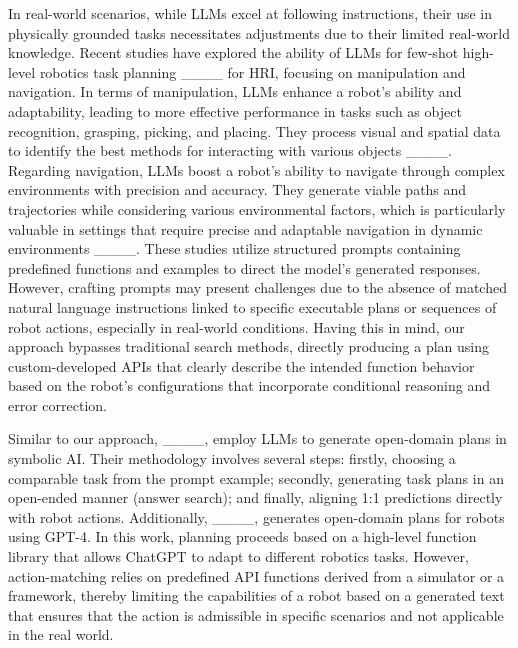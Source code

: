 In real-world scenarios, while LLMs excel at following instructions, their use in physically grounded tasks necessitates adjustments due to their limited real-world knowledge. 
Recent studies have explored the ability of LLMs for few-shot high-level robotics task planning ____ for HRI, focusing on manipulation and navigation. In terms of manipulation, LLMs enhance a robot's ability and adaptability, leading to more effective performance in tasks such as object recognition, grasping, picking, and placing. They process visual and spatial data to identify the best methods for interacting with various objects ____. Regarding navigation, LLMs boost a robot’s ability to navigate through complex environments with precision and accuracy. They generate viable paths and trajectories while considering various environmental factors, which is particularly valuable in settings that require precise and adaptable navigation in dynamic environments ____. These studies utilize structured prompts containing predefined functions and examples to direct the model's generated responses. However, crafting prompts may present challenges due to the absence of matched natural language instructions linked to specific executable plans or sequences of robot actions, especially in real-world conditions. Having this in mind, our approach bypasses traditional search methods, directly producing a plan using custom-developed APIs that clearly describe the intended function behavior based on the robot's configurations that incorporate conditional reasoning and error correction.


\color{black}
Similar to our approach, ____, employ LLMs to generate open-domain plans in symbolic AI. Their methodology involves several steps: firstly, choosing a comparable task from the prompt example; secondly, generating task plans in an open-ended manner (answer search); and finally, aligning 1:1 predictions directly with robot actions. Additionally, ____, generates open-domain plans for robots using GPT-4. In this work, planning proceeds based on a high-level function library that allows ChatGPT to adapt to different robotics tasks. However, action-matching relies on predefined API functions derived from a simulator or a framework, thereby limiting the capabilities of a robot based on a generated text that ensures that the action is admissible in specific scenarios and not applicable in the real world.


